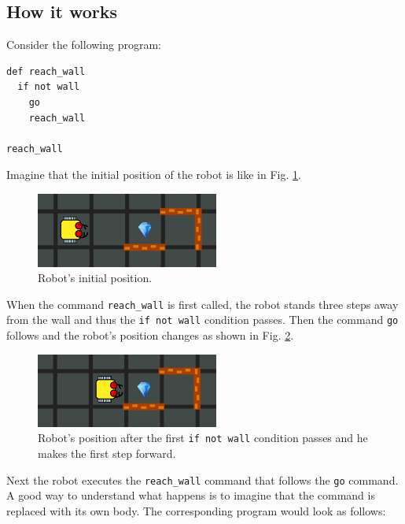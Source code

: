 \documentclass[article,A4,12pt]{llncs}
\begin{document}
{{{{\subsection{How it works} 

Consider the following program:
\begin{verbatim}
def reach_wall
  if not wall
    go
    reach_wall

reach_wall
\end{verbatim}
Imagine that the initial position of the robot is like in Fig. \ref{fig:rec1}.

\begin{figure}[!ht]
\begin{center}
\includegraphics[width=6cm]{img/rec-1.png}
\end{center}
\vspace{-4mm}
\caption{Robot's initial position.}
\label{fig:rec1}
\vspace{-4mm}
\end{figure}
\noindent
When the command {\tt reach\_wall} is first called, the robot stands three steps away from the wall and 
thus the {\tt if not wall} condition passes. Then the command {\tt go} follows and the robot's 
position changes as shown in Fig. \ref{fig:rec2}. 

\begin{figure}[!ht]
\begin{center}
\includegraphics[width=6cm]{img/rec-2.png}
\end{center}
\vspace{-4mm}
\caption{Robot's position after the first {\tt if not wall} condition passes and he makes the first step forward.}
\label{fig:rec2}
\vspace{-10mm}
\end{figure}
\newpage
\noindent
Next the robot executes the {\tt reach\_wall} command that follows the {\tt go} command. A good way to 
understand what happens is to imagine that the command is replaced with its own body. The corresponding 
program would look as follows:

}}}}
\end{document}
